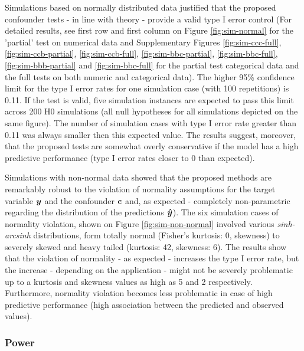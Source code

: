 \documentclass{article}
\begin{document}
Simulations based on normally distributed data justified that the proposed confounder tests - in line with theory - provide a valid type I error control (For detailed results, see first row and first column on Figure \ref{fig:sim-normal} for the 'partial' test on numerical data and Supplementary Figures \ref{fig:sim-ccc-full}, \ref{fig:sim-ccb-partial}, \ref{fig:sim-ccb-full}, \ref{fig:sim-bbc-partial}, \ref{fig:sim-bbc-full}, \ref{fig:sim-bbb-partial} and \ref{fig:sim-bbc-full} for the partial test categorical data and the full tests on both numeric and categorical data). The higher 95\% confidence limit for the type I error rates for one simulation case (with 100 repetitions) is 0.11. If the test is valid, five simulation instances are expected to pass this limit across 200 H0 simulations (all null hypotheses for all simulations depicted on the same figure). The number of simulation cases with type I error rate greater than 0.11 was always smaller then this expected value.
The results suggest, moreover, that the proposed tests are somewhat overly conservative if the model has a high predictive performance (type I error rates closer to 0 than expected).

Simulations with non-normal data showed that the proposed methods are remarkably robust to the violation of normality assumptions for the target variable $\boldsymbol{y}$ and the confounder $\boldsymbol{c}$ and, as expected - completely non-parametric regarding the distribution of the predictions $\boldsymbol{\hat{y}}$). The six simulation cases of normality violation, shown on Figure \ref{fig:sim-non-normal} involved various \emph{sinh-arcsinh} distributions, form totally normal (Fisher's kurtosis: 0, skewness) to severely skewed and heavy tailed (kurtosis: 42, skewness: 6).
The results show that the violation of normality - as expected - increases the type I error rate, but the increase - depending on the application - might not be severely problematic up to a kurtosis and skewness values as high as 5 and 2 respectively. Furthermore, normality violation becomes less problematic in case of high predictive performance (high association between the predicted and observed values).

\subsubsection*{Power}
\end{document}
